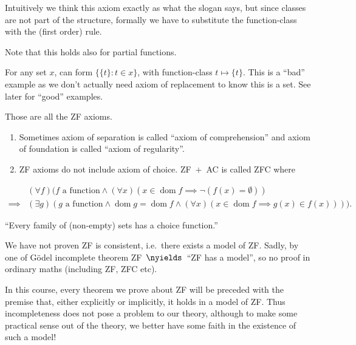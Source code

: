 \documentclass[a4paper]{article}
\DeclareMathOperator{\dom}{dom}%
\begin{document}
Intuitively we think this axiom exactly as what the slogan says, but since classes are not part of the structure, formally we have to substitute the function-class with the (first order) rule.

Note that this holds also for partial functions.

\begin{eg}
  For any set \(x\), can form \(\{\{t\}: t \in x\}\), with function-class \(t \mapsto \{t\}\). This is a ``bad'' example as we don't actually need axiom of replacement to know this is a set. See later for ``good'' examples.
\end{eg}

Those are all the ZF axioms.

\begin{note}\leavevmode
  \begin{enumerate}
  \item Sometimes axiom of separation is called ``axiom of comprehension'' and axiom of foundation is called ``axiom of regularity''.
  \item ZF axioms do not include axiom of choice. ZF~\(+\)~AC is called ZFC where
  \end{enumerate}
\end{note}
\begin{axiom*}
  \begin{align*}
    & (\forall f) (f \text{ a function} \land (\forall x) (x \in \dom f \implies \neg (f(x) = \emptyset)) \\
    \implies & (\exists g) (g \text{ a function} \land \dom g = \dom f \land (\forall x) (x \in \dom f \implies g(x) \in f(x)))).
  \end{align*}
\end{axiom*}
``Every family of (non-empty) sets has a choice function.''

\begin{remark}
  We have not proven ZF is consistent, i.e.\ there exists a model of ZF. Sadly, by one of Gödel incomplete theorem ZF~\(\nyields\)~``ZF has a model'', so no proof in ordinary maths (including ZF, ZFC etc).
\end{remark}

In this course, every theorem we prove about ZF will be preceded with the premise that, either explicitly or implicitly, it holds in a model of ZF. Thus incompleteness does not pose a problem to our theory, although to make some practical sense out of the theory, we better have some faith in the existence of such a model!
\end{document}
